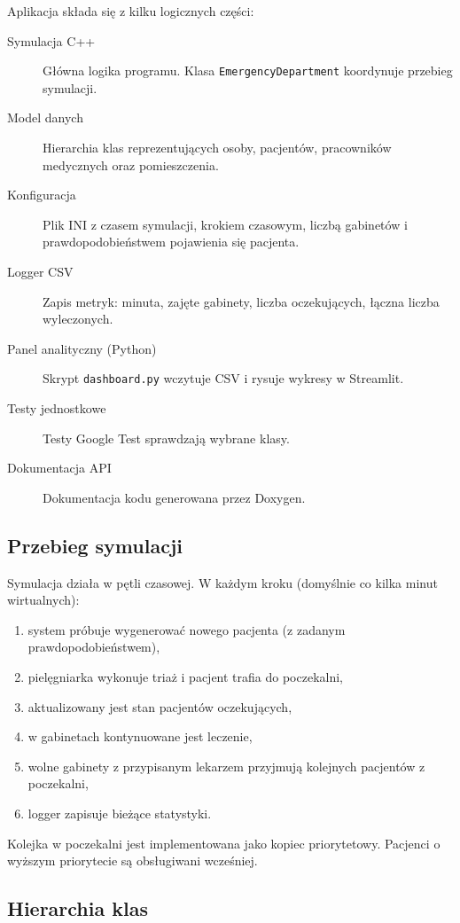\documentclass[12pt,a4paper]{article}
\begin{document}
Aplikacja składa się z kilku logicznych części:
\begin{description}
	\item[Symulacja C++] Główna logika programu. Klasa
	      \texttt{EmergencyDepartment} koordynuje przebieg symulacji.
	\item[Model danych] Hierarchia klas reprezentujących osoby, pacjentów,
	      pracowników medycznych oraz pomieszczenia.
	\item[Konfiguracja] Plik INI z czasem symulacji, krokiem czasowym, liczbą
	      gabinetów i prawdopodobieństwem pojawienia się pacjenta.
	\item[Logger CSV] Zapis metryk: minuta, zajęte gabinety, liczba oczekujących,
	      łączna liczba wyleczonych.
	\item[Panel analityczny (Python)] Skrypt \texttt{dashboard.py} wczytuje CSV
	      i rysuje wykresy w Streamlit.
	\item[Testy jednostkowe] Testy Google Test sprawdzają wybrane klasy.
	\item[Dokumentacja API] Dokumentacja kodu generowana przez Doxygen.
\end{description}

\subsection{Przebieg symulacji}

Symulacja działa w pętli czasowej. W każdym kroku (domyślnie co kilka minut
wirtualnych):
\begin{enumerate}[noitemsep]
	\item system próbuje wygenerować nowego pacjenta (z zadanym prawdopodobieństwem),
	\item pielęgniarka wykonuje triaż i pacjent trafia do poczekalni,
	\item aktualizowany jest stan pacjentów oczekujących,
	\item w gabinetach kontynuowane jest leczenie,
	\item wolne gabinety z przypisanym lekarzem przyjmują kolejnych pacjentów
	      z poczekalni,
	\item logger zapisuje bieżące statystyki.
\end{enumerate}

Kolejka w poczekalni jest implementowana jako kopiec priorytetowy. Pacjenci
o wyższym priorytecie są obsługiwani wcześniej.

\subsection{Hierarchia klas}
\end{document}
